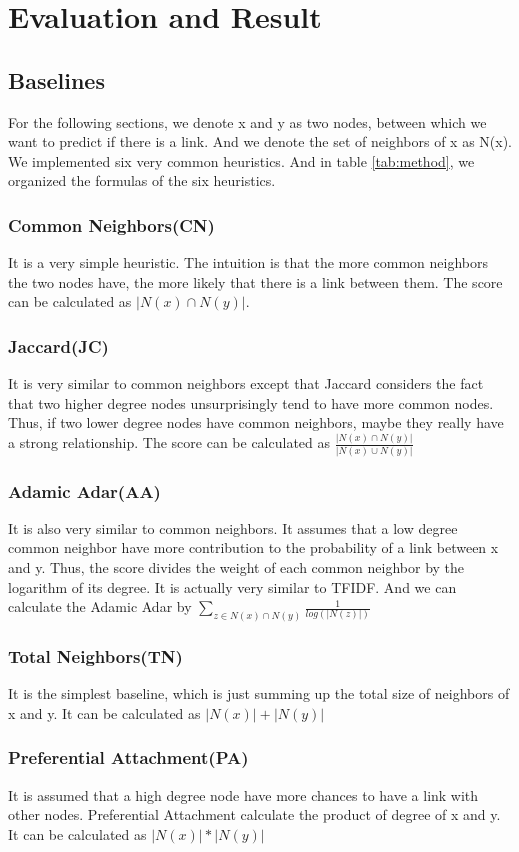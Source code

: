\documentclass[12pt]{article}
\begin{document}
\section{Evaluation and Result}

\subsection{Baselines}
For the following sections, we denote x and y as two nodes, between which we want to predict if there is a link. And we denote the set of neighbors of x as N(x). We implemented six very common heuristics. And in table \ref{tab:method}, we organized the formulas of the six heuristics. \\
\subsubsection{Common Neighbors(CN)}
It is a very simple heuristic. The intuition is that the more common neighbors the two nodes have, the more likely that there is a link between them. The score can be calculated as $|N(x) \cap N(y)|$.
\subsubsection{Jaccard(JC)}
It is very similar to common neighbors except that Jaccard considers the fact that two higher degree nodes unsurprisingly tend to have more common nodes. Thus, if two lower degree nodes have common neighbors, maybe they really have a strong relationship. The score can be calculated as $\frac{|N(x) \cap N(y)|}{|N(x) \cup N(y)|}$
\subsubsection{Adamic Adar(AA)}
It is also very similar to common neighbors. It assumes that a low degree common neighbor have more contribution to the probability of a link between x and y. Thus, the score divides the weight of each common neighbor by the logarithm of its degree. It is actually very similar to TFIDF. And we can calculate the Adamic Adar by $\sum_{z \in N(x) \cap N(y)}{\frac{1}{log(|N(z)|)}}$
\subsubsection{Total Neighbors(TN)}
It is the simplest baseline, which is just summing up the total size of neighbors of x and y. It can be calculated as $|N(x)| + |N(y)|$
\subsubsection{Preferential Attachment(PA)}
It is assumed that a high degree node have more chances to have a link with other nodes. Preferential Attachment calculate the product of degree of x and y. It can be calculated as $|N(x)| * |N(y)|$
\end{document}
